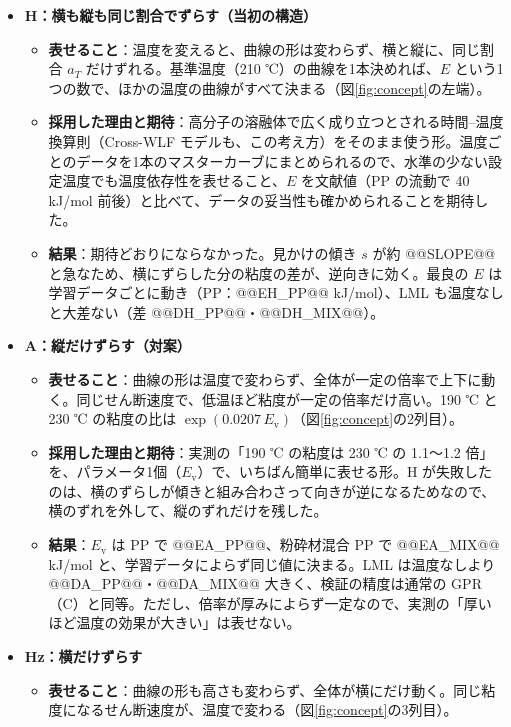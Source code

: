 \documentclass[paper=a4paper,fontsize=10.5pt,line_length=44zw,number_of_lines=38]{jlreq}
\newcommand{\Ev}{E_{\mathrm{v}}}
\newenvironment{points}{\begin{itemize}[label=$\triangleright$,leftmargin=1.5\zw,itemsep=0.3ex,topsep=0.5ex,parsep=0pt]}{\end{itemize}}
\newcommand{\ptn}[1]{\item \textbf{#1}}
\begin{document}
\begin{points}
\ptn{H：横も縦も同じ割合でずらす（当初の構造）}
  \begin{itemize}[leftmargin=1.5\zw,itemsep=0.2ex,topsep=0.2ex,parsep=0pt]
  \item \textbf{表せること}：温度を変えると、曲線の形は変わらず、横と縦に、同じ割合 $a_T$ だけずれる。基準温度（210 ℃）の曲線を1本決めれば、$E$ という1つの数で、ほかの温度の曲線がすべて決まる（図\ref{fig:concept}の左端）。
  \item \textbf{採用した理由と期待}：高分子の溶融体で広く成り立つとされる時間--温度換算則（Cross-WLF モデルも、この考え方）をそのまま使う形。温度ごとのデータを1本のマスターカーブにまとめられるので、水準の少ない設定温度でも温度依存性を表せること、$E$ を文献値（PP の流動で 40 kJ/mol 前後）と比べて、データの妥当性も確かめられることを期待した。
  \item \textbf{結果}：期待どおりにならなかった。見かけの傾き $s$ が約 @@SLOPE@@ と急なため、横にずらした分の粘度の差が、逆向きに効く。最良の $E$ は学習データごとに動き（PP：@@EH_PP@@ kJ/mol）、LML も温度なしと大差ない（差 @@DH_PP@@・@@DH_MIX@@）。
  \end{itemize}
\ptn{A：縦だけずらす（対案）}
  \begin{itemize}[leftmargin=1.5\zw,itemsep=0.2ex,topsep=0.2ex,parsep=0pt]
  \item \textbf{表せること}：曲線の形は温度で変わらず、全体が一定の倍率で上下に動く。同じせん断速度で、低温ほど粘度が一定の倍率だけ高い。190 ℃ と 230 ℃ の粘度の比は $\exp(0.0207\,\Ev)$（図\ref{fig:concept}の2列目）。
  \item \textbf{採用した理由と期待}：実測の「190 ℃ の粘度は 230 ℃ の 1.1〜1.2 倍」を、パラメータ1個（$\Ev$）で、いちばん簡単に表せる形。H が失敗したのは、横のずらしが傾きと組み合わさって向きが逆になるためなので、横のずれを外して、縦のずれだけを残した。
  \item \textbf{結果}：$\Ev$ は PP で @@EA_PP@@、粉砕材混合 PP で @@EA_MIX@@ kJ/mol と、学習データによらず同じ値に決まる。LML は温度なしより @@DA_PP@@・@@DA_MIX@@ 大きく、検証の精度は通常の GPR（C）と同等。ただし、倍率が厚みによらず一定なので、実測の「厚いほど温度の効果が大きい」は表せない。
  \end{itemize}
\ptn{Hz：横だけずらす}
  \begin{itemize}[leftmargin=1.5\zw,itemsep=0.2ex,topsep=0.2ex,parsep=0pt]
  \item \textbf{表せること}：曲線の形も高さも変わらず、全体が横にだけ動く。同じ粘度になるせん断速度が、温度で変わる（図\ref{fig:concept}の3列目）。

\end{itemize}
\end{points}
\end{document}
